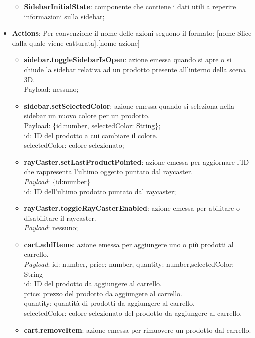 \begin{itemize}
\begin{itemize}
			\item \textbf{SidebarInitialState}: componente che contiene i dati utili a reperire informazioni sulla sidebar;
		\end{itemize}
		\item \textbf{\large Actions}:
		Per convenzione il nome delle azioni seguono il formato: [nome Slice dalla quale viene catturata].[nome azione]
		\begin{itemize}
			\item \textbf{sidebar.toggleSidebarIsOpen}: azione emessa quando si apre o si chiude la sidebar relativa ad un prodotto presente 
			all'interno della scena 3D.
			\\
			Payload: nessuno;
			\item \textbf{sidebar.setSelectedColor}: azione emessa quando si seleziona nella sidebar un nuovo colore per un prodotto.
			\\
			Payload: \{id:number, selectedColor: String\};
			\\
			id: ID del prodotto a cui cambiare il colore.
			\\
			selectedColor: colore selezionato;
			\item \textbf{rayCaster.setLastProductPointed}: azione emessa per aggiornare l'ID che rappresenta l'ultimo oggetto puntato dal raycaster.
			\\
			\textit{Payload}: \{id:number\}
			\\
			id: ID dell'ultimo prodotto puntato dal raycaster;
			\item \textbf{rayCaster.toggleRayCasterEnabled}: azione emessa per abilitare o disabilitare il raycaster.
			\\
			\textit{Payload}: nessuno;
			\item \textbf{cart.addItems}: azione emessa per aggiungere uno o più prodotti al carrello.
			\\
			\textit{Payload}: {id: number, price: number, quantity: number,selectedColor: String}
			\\
			id: ID del prodotto da aggiungere al carrello.
			\\
			price: prezzo del prodotto da aggiungere al carrello.
			\\
			quantity: quantità di prodotti da aggiungere al carrello.
			\\
			selectedColor: colore selezionato del prodotto da aggiungere al carrello.
			\item \textbf{cart.removeItem}: azione emessa per rimuovere un prodotto dal carrello.
			\\

\end{itemize}
\end{itemize}
